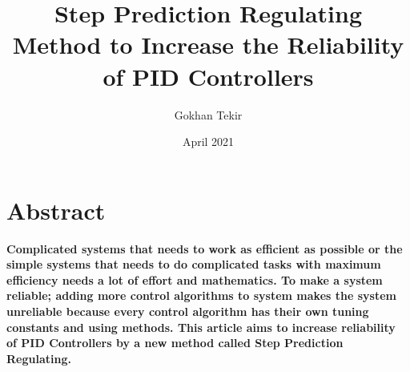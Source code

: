 \documentclass[9pt]{article}
\title{\textbf{\LARGE{Step Prediction Regulating Method to Increase the Reliability of PID Controllers}}}
\author{\Large{Gokhan Tekir }}
\date{April 2021}
\begin{document}
\maketitle

\section{Abstract}
\textbf{Complicated systems that needs to work as efficient as possible or the simple systems that needs to do complicated tasks with maximum efficiency needs a lot of effort and mathematics. To make a system reliable; adding more control algorithms to system makes the system unreliable because every control algorithm has their own tuning constants and using methods.
This article aims to increase reliability of PID Controllers by a new method called Step Prediction Regulating.}
\end{document}
